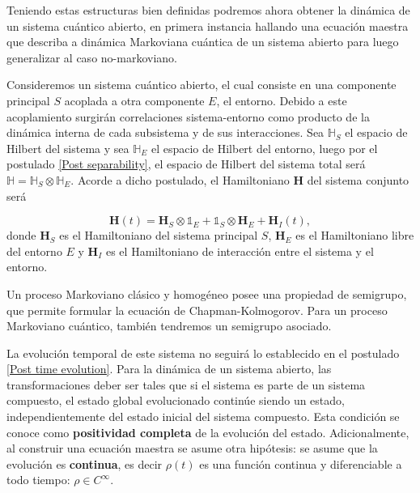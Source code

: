 \documentclass{report} %
\numberwithin{equation}{section}
\begin{document}
Teniendo estas estructuras bien definidas podremos ahora obtener la dinámica de un sistema cuántico abierto, en primera instancia hallando una ecuación maestra que describa a dinámica Markoviana cuántica de un sistema abierto para luego generalizar al caso no-markoviano. 
 
Consideremos un sistema cuántico abierto, el cual consiste en una componente principal $S$ acoplada a otra componente $E$, el entorno. Debido a este acoplamiento surgirán correlaciones sistema-entorno como producto de la dinámica interna de cada subsistema y de sus interacciones.
Sea $\mathbb{H}_S$ el espacio de Hilbert del sistema y sea $\mathbb{H}_E$ el espacio de Hilbert del entorno, luego por el postulado \ref{Post separability}, el espacio de Hilbert del sistema total será $\mathbb{H} = \mathbb{H}_S \otimes \mathbb{H}_E$. Acorde a dicho postulado, el Hamiltoniano $\mathbf{H}$ del sistema conjunto será 

\begin{equation}
\mathbf{H}(t)= \mathbf{H}_S \otimes \mathds{1}_E + \mathds{1}_S \otimes \mathbf{H}_E + \mathbf{H}_I (t),
\end{equation}
donde $\mathbf{H}_S$ es el Hamiltoniano del sistema principal $S$, $\mathbf{H}_E$ es el Hamiltoniano libre del entorno $E$ y $\mathbf{H}_I$ es el Hamiltoniano de interacción entre el sistema y el entorno. 

\begin{Omitir}
Un proceso Markoviano clásico y homogéneo posee una propiedad de semigrupo, que permite formular la ecuación de Chapman-Kolmogorov. Para un proceso Markoviano cuántico, también tendremos un semigrupo asociado.
\end{Omitir}

La evolución temporal de este sistema no seguirá lo establecido en el postulado \ref{Post time evolution}. Para la dinámica de un sistema abierto, las transformaciones deber ser tales que si el sistema es parte de un sistema compuesto, el estado global evolucionado continúe siendo un estado, independientemente del estado inicial del sistema compuesto. Esta condición se conoce como \textbf{positividad completa} \cite{Nielsen.00} de la evolución del estado. Adicionalmente, al construir una ecuación maestra se asume otra hipótesis: se asume que la evolución es \textbf{continua}, es decir $\rho(t)$ es una función continua y diferenciable a todo tiempo: $\rho \in{C}^{\infty}$.
\end{document}
